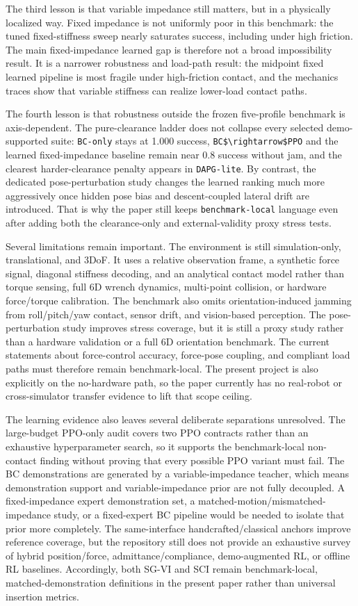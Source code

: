 ﻿\documentclass[11pt]{article}
\newcommand{\code}[1]{\nolinkurl{#1}}
\begin{document}
The third lesson is that variable impedance still matters, but in a physically localized way.
Fixed impedance is not uniformly poor in this benchmark: the tuned fixed-stiffness sweep nearly
saturates success, including under high friction. The main fixed-impedance learned gap is therefore
not a broad impossibility result. It is a narrower robustness and load-path result: the midpoint
fixed learned pipeline is most fragile under high-friction contact, and the mechanics traces show
that variable stiffness can realize lower-load contact paths.

The fourth lesson is that robustness outside the frozen five-profile benchmark is axis-dependent.
The pure-clearance ladder does not collapse every selected demo-supported suite: \code{BC-only}
stays at 1.000 success, \code{BC$\rightarrow$PPO} and the learned fixed-impedance baseline remain
near 0.8 success without jam, and the clearest harder-clearance penalty appears in
\code{DAPG-lite}. By contrast, the dedicated pose-perturbation study changes the learned ranking
much more aggressively once hidden pose bias and descent-coupled lateral drift are introduced. That
is why the paper still keeps \code{benchmark-local} language even after adding both the
clearance-only and external-validity proxy stress tests.

Several limitations remain important. The environment is still simulation-only, translational, and
3DoF. It uses a relative observation frame, a synthetic force signal, diagonal stiffness decoding,
and an analytical contact model rather than torque sensing, full 6D wrench dynamics, multi-point
collision, or hardware force/torque calibration. The benchmark also omits orientation-induced jamming
from roll/pitch/yaw contact, sensor drift, and vision-based perception. The pose-perturbation study
improves stress coverage, but it is still a proxy study rather than a hardware validation or a full
6D orientation benchmark. The current statements about force-control accuracy, force-pose coupling,
and compliant load paths must therefore remain benchmark-local. The present project is also
explicitly on the no-hardware path, so the paper currently has no real-robot or cross-simulator
transfer evidence to lift that scope ceiling.

The learning evidence also leaves several deliberate separations unresolved. The large-budget
PPO-only audit covers two PPO contracts rather than an exhaustive hyperparameter search, so it
supports the benchmark-local non-contact finding without proving that every possible PPO variant
must fail. The BC demonstrations are generated by a variable-impedance teacher, which means
demonstration support and variable-impedance prior are not fully decoupled. A fixed-impedance
expert demonstration set, a matched-motion/mismatched-impedance study, or a fixed-expert BC
pipeline would be needed to isolate that prior more completely. The same-interface
handcrafted/classical anchors improve reference coverage, but the repository still does not
provide an exhaustive survey of hybrid position/force, admittance/compliance, demo-augmented RL,
or offline RL baselines. Accordingly, both SG-VI and SCI remain benchmark-local, matched-demonstration definitions in the present paper rather than universal insertion metrics.
\end{document}
